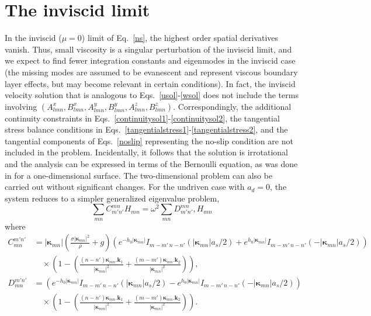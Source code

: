 \documentclass[aps,pre,amsmath,amssymb,floatfix,onecolumn,notitlepage,10pt]{revtex4-1}
\begin{document}
\section{The inviscid limit}
In the inviscid ($\mu=0$) limit of Eq.~\eqref{ns}, the highest order spatial derivatives vanish. Thus, small viscosity is a singular perturbation of the inviscid limit, and we expect to find fewer integration constants and eigenmodes in the inviscid case (the missing modes are assumed to be evanescent and represent viscous boundary layer effects, but may become relevant in certain conditions). In fact, the inviscid velocity solution that is analogous to Eqs.~\eqref{usol}-\eqref{wsol} does not include the terms involving $(A_{lmn}^x,B_{lmn}^x,A_{lmn}^y,B_{lmn}^y, A_{lmn}^z, B_{lmn}^z)$. Correspondingly, the additional continuity constraints in Eqs.~\eqref{continuitysol1}-\eqref{continuitysol2}, the tangential stress balance conditions in Eqs.~\eqref{tangentialstress1}-\eqref{tangentialstress2}, and the tangential components of Eqs.~\eqref{noslip} representing the no-slip condition are not included in the problem. Incidentally, it follows that the solution is irrotational and the analysis can be expressed in terms of the Bernoulli equation, as was done in \cite{2021_Nicolaou_1} for a one-dimensional surface. The two-dimensional problem can also be carried out without significant changes. For the undriven case with $a_d=0$, the system reduces to a simpler generalized eigenvalue problem,
\begin{equation}
\sum_{mn} C^{mn}_{m'n'} H_{mn} = \omega^2 \sum_{mn} D^{mn}_{m'n'}, H_{mn}
\end{equation}
where
\begin{align}
C^{m'n'}_{mn}&=\left| \bm{\kappa}_{mn}\right| \left(\frac{\sigma  \left| \bm{\kappa}_{mn}\right| ^2}{\rho }+g\right) \left(e^{-{h_0} \left| \bm{\kappa}_{mn}\right| } I_{m-m'\, n-n'}\left(\left| \bm{\kappa}_{mn}\right|  {a_s}/2\right) + e^{{h_0} \left| \bm{\kappa}_{mn}\right| } I_{m-m'\, n-n'}\left(-\left| \bm{\kappa}_{mn}\right|  {a_s}/2\right) \right) \nonumber \\
&\quad \times \left(1- \left(\frac{({n}-{n'}) \bm{\kappa}_{mn}.\mathbf{k}_1}{\left| \bm{\kappa}_{mn}\right| ^2}+\frac{({m}-{m'}) \bm{\kappa}_{mn}.\mathbf{k}_2}{\left| \bm{\kappa}_{mn}\right| ^2}\right)\right), \\
D^{m'n'}_{mn}&= \left(e^{-{h_0} \left| \bm{\kappa}_{mn}\right| } I_{m-m'\, n-n'}\left(\left| \bm{\kappa}_{mn}\right|  {a_s}/2\right) - e^{{h_0} \left| \bm{\kappa}_{mn}\right| } I_{m-m'\, n-n'}\left(-\left| \bm{\kappa}_{mn}\right|  {a_s}/2\right) \right) \nonumber \\
&\quad \times \left(1- \left(\frac{({n}-{n'}) \bm{\kappa}_{mn}.\mathbf{k}_1}{\left| \bm{\kappa}_{mn}\right| ^2}+\frac{({m}-{m'}) \bm{\kappa}_{mn}.\mathbf{k}_2}{\left| \bm{\kappa}_{mn}\right| ^2}\right)\right).
\end{align}
\end{document}
